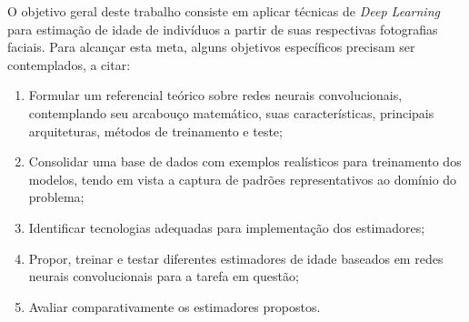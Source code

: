 O objetivo geral deste trabalho consiste em aplicar técnicas de \emph{Deep Learning} para estimação de idade de indivíduos a partir de suas respectivas fotografias faciais. Para alcançar esta meta, alguns objetivos específicos precisam ser contemplados, a citar:

\begin{enumerate}
     \item Formular um referencial teórico sobre redes neurais convolucionais, contemplando seu arcabouço matemático, suas características, principais arquiteturas, métodos de treinamento e teste;
     \item Consolidar uma base de dados com exemplos realísticos para treinamento dos modelos, tendo em vista a captura de padrões representativos ao domínio do problema;
     \item Identificar tecnologias adequadas para implementação dos estimadores;
     \item Propor, treinar e testar diferentes estimadores de idade baseados em redes neurais convolucionais para a tarefa em questão;
     \item Avaliar comparativamente os estimadores propostos.
\end{enumerate}
